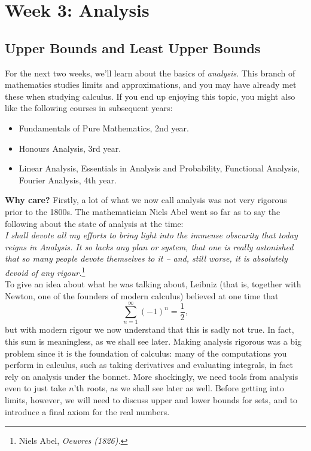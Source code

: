 \documentclass[11pt,dvipsnames]{book}
\numberwithin{figure}{section} %
\numberwithin{table}{section} %
\begin{document}

\part{Week 3: Analysis}


\chapter{Upper Bounds and Least Upper Bounds}%
\label{upperbounds}

For the next two weeks, we'll learn about the basics of {\it analysis}. This branch of mathematics studies limits and approximations, and you may have already met these when studying calculus. If you end up enjoying this topic, you might also like the following courses in subsequent years:

\begin{itemize}
\item Fundamentals of Pure Mathematics, 2nd year.
\item Honours Analysis, 3rd year.
\item Linear Analysis, Essentials in Analysis and Probability, Functional Analysis, Fourier Analysis, 4th year.
\end{itemize}

\medskip
{\bf Why care?} Firstly, a lot of what we now call analysis was not very rigorous prior to the 1800s. The mathematician Niels Abel went so far as to say the following about the state of analysis at the time:\\

{\it  I shall devote all my efforts to bring light into the immense obscurity that today reigns in Analysis. It so lacks any plan or system, that one is really astonished that so many people devote themselves to it -- and, still worse, it is absolutely devoid of any rigour.}\footnote{Niels Abel, {\it Oeuvres (1826).}}\\

To give an idea about what he was talking about, Leibniz (that is, together with Newton, one of the founders of modern calculus) believed at one time that
\[
\sum_{n=1}^{\infty} (-1)^{n} = \frac{1}{2},
\]
but with modern rigour we now understand that this is sadly not true. In fact, this sum is meaningless, as we shall see later. Making analysis rigorous was a big problem since it is the foundation of calculus:  many of the computations you perform in calculus, such as taking derivatives and evaluating integrals, in fact rely on analysis under the bonnet. More shockingly, we need tools from analysis even to just take $n$'th roots, as we shall see later as well. Before getting into limits, however, we will need to discuss upper and lower bounds for sets, and to introduce a final axiom for the real numbers.
\end{document}
